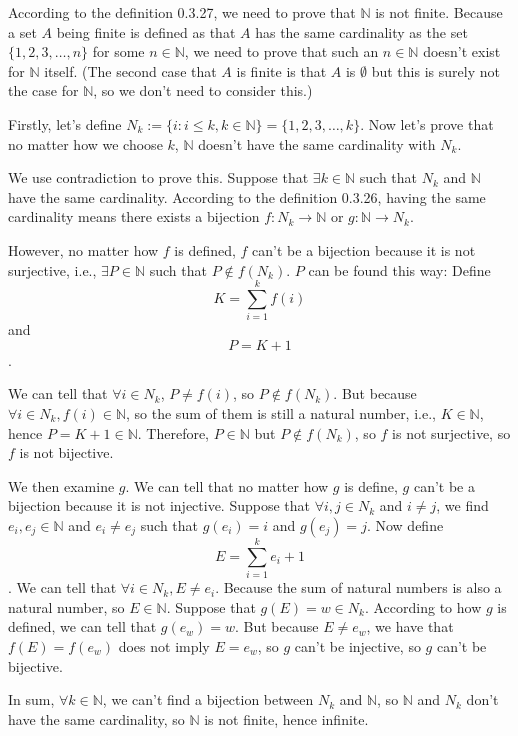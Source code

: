 \documentclass[12pt, letterpaper, oneside]{book}
\begin{document}
According to the definition 0.3.27, we need to prove that $\mathbb{N}$ is not
finite. Because a set $A$ being finite is defined as that $A$ has the same
cardinality as the set $\{1, 2, 3, \ldots, n\}$ for some $n \in \mathbb{N}$, we
need to prove that such an $n \in \mathbb{N}$ doesn't exist for $\mathbb{N}$
itself. (The second case that $A$ is finite is that $A$ is $\emptyset$ but this
is surely not the case for $\mathbb{N}$, so we don't need to consider this.)

Firstly, let's define $N_k:= \{i: i \leq k, k \in \mathbb{N}\} = \{1, 2, 3,
\ldots, k\}$. Now let's prove that no matter how we choose $k$, $\mathbb{N}$
doesn't have the same cardinality with $N_k$.

We use contradiction to prove this. Suppose that $\exists k \in \mathbb{N}$
such that $N_k$ and $\mathbb{N}$ have the same cardinality. According to the
definition 0.3.26, having the same cardinality means there exists a bijection
$f: N_k \rightarrow \mathbb{N}$ or $g: \mathbb{N} \rightarrow N_k$.

However, no matter how $f$ is defined, $f$ can't be a bijection because it is
not surjective, i.e., $\exists P \in \mathbb{N}$ such that $P \notin f(N_k)$.
$P$ can be found this way: Define \[K = \sum_{i=1}^{k} f(i) \] and \[P = K +
1\].

We can tell that $\forall i \in N_k$, $P \neq f(i)$, so $P \notin f(N_k)$. But
because $\forall i \in N_k, f(i) \in \mathbb{N}$, so the sum of them is still
a natural number, i.e., $K \in \mathbb{N}$, hence $P = K + 1 \in \mathbb{N}$.
Therefore, $P \in \mathbb{N}$ but $P \notin f(N_k)$, so $f$ is not surjective,
so $f$ is not bijective.

We then examine $g$. We can tell that no matter how $g$ is define, $g$ can't be
a bijection because it is not injective. Suppose that $\forall i, j \in N_k$
and $i \neq j$, we find $e_i, e_j \in \mathbb{N}$ and $e_i \neq e_j$ such that
$g(e_i) = i$ and $g(e_j) = j$. Now define \[E = \sum_{i=1}^{k} e_i + 1\]. We
can tell that $\forall i \in N_k, E \neq e_i$. Because the sum of natural
numbers is also a natural number, so $E \in \mathbb{N}$. Suppose that $g(E) = w
\in N_k$. According to how $g$ is defined, we can tell that $g(e_w) = w$. But
because $E \neq e_w$, we have that $f(E) = f(e_w)$ does not imply $E = e_w$, so
$g$ can't be injective, so $g$ can't be bijective.

In sum, $\forall k \in \mathbb{N}$, we can't find a bijection between $N_k$ and
$\mathbb{N}$, so $\mathbb{N}$ and $N_k$ don't have the same cardinality, so
$\mathbb{N}$ is not finite, hence infinite.
\end{document}
